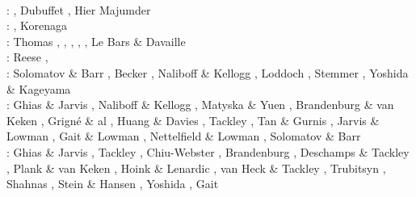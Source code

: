 \begin{scriptsize}
                 \cite{burm01}\cite{dabu01}\\
\twothousandtwo: \cite{tasu02}\cite{modm02}
                 \cite{tack02}\cite{vaya02}
                 \cite{vayu02}\cite{taxi02}
                 \cite{scbh02}\cite{strb02}, 
                 Dubuffet \etal \cite{duyr02}, Hier Majumder \etal{} \cite{hiys02}\\
\twothousandthree: \cite{hapa03}\cite{lemo03}
                   \cite{mumc03}\cite{fasa03}
                   \cite{heta03}\cite{sibu03}
                   \cite{ogaw03,ogaw03b},
                  Korenaga \cite{kore03} \\
\twothousandfour: Thomas \etal \cite{thkl04}, \cite{vavv04b}
                  \cite{xita04b}\cite{xita04},
                  \cite{nata04b}\cite{vayr04},
                  \cite{brws04}\cite{stsh04},
                  \cite{scbh04}, Le Bars \& Davaille \cite{leda04,leda04b} \\
\twothousandfive: Reese \etal \cite{resb05}, \cite{taxn05}
                  \cite{bupc05}\cite{grlt05}
                  \cite{lemj05}\cite{kogk05}
                  \cite{mczh05b}\cite{vary05}
                  \cite{nata05}\cite{nabu05}
                  \cite{chob05}\cite{phbu05}
                  \cite{hosh05}\\
\twothousandsix: Solomatov \& Barr \cite{soba06}, Becker \cite{beck06}, Naliboff \& Kellogg \cite{nake06},
                 Loddoch \etal \cite{losh06}, Stemmer \etal \cite{sthh06}, Yoshida \& Kageyama \cite{yoka06}\\
\twothousandseven: Ghias \& Jarvis \cite{ghja07}, Naliboff \& Kellogg \cite{nake07}, 
                   Matyska \& Yuen \cite{mayu07}, Brandenburg \& van Keken \cite{brva07a,brva07b},
                   Grign\'e \& al \cite{grlt07,grlt07b}, Huang \& Davies \cite{huda07},
                   Tackley \etal \cite{tanh07}, Tan \& Gurnis \cite{tagu07}, 
                   Jarvis \& Lowman \cite{jalo07}, Gait \& Lowman \cite{galo07,galo07b}, 
                   Nettelfield \& Lowman \cite{nelo07}, Solomatov \& Barr \cite{soba07}\\
\twothousandeight: Ghias \& Jarvis \cite{ghja08}, Tackley \cite{tack08,tack08b},
                   Chiu-Webster \etal \cite{chhl08}, Brandenburg \etal \cite{brhv08},
                   Deschamps \& Tackley \cite{deta08}, Plank \& van Keken \cite{plva08},
                   Hoink \& Lenardic \cite{hole08}, van Heck \& Tackley \cite{vata08},
                   Trubitsyn \etal \cite{trkr08}, Shahnas \etal \cite{shlj08},
                   Stein \& Hansen \cite{stha08}, Yoshida \cite{yosh08}, Gait \etal \cite{galg08}\\

\end{scriptsize}
